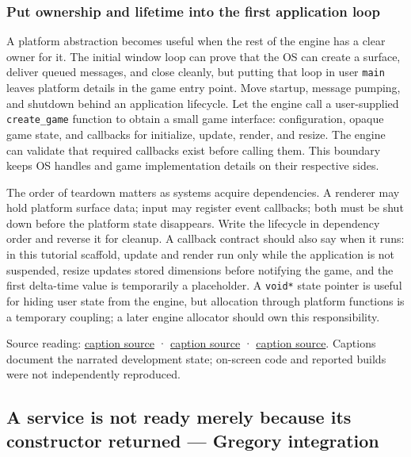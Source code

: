 \subsubsection{Put ownership and lifetime into the first application loop}\label{05-engine-i-ch013-put-ownership-and-lifetime-into-the-first-application-loop}

A platform abstraction becomes useful when the rest of the engine has a clear owner for it. The initial window loop can prove that the OS can create a surface, deliver queued messages, and close cleanly, but putting that loop in user \texttt{main} leaves platform details in the game entry point. Move startup, message pumping, and shutdown behind an application lifecycle. Let the engine call a user-supplied \texttt{create\_game} function to obtain a small game interface: configuration, opaque game state, and callbacks for initialize, update, render, and resize. The engine can validate that required callbacks exist before calling them. This boundary keeps OS handles and game implementation details on their respective sides.

The order of teardown matters as systems acquire dependencies. A renderer may hold platform surface data; input may register event callbacks; both must be shut down before the platform state disappears. Write the lifecycle in dependency order and reverse it for cleanup. A callback contract should also say when it runs: in this tutorial scaffold, update and render run only while the application is not suspended, resize updates stored dimensions before notifying the game, and the first delta-time value is temporarily a placeholder. A \texttt{void*} state pointer is useful for hiding user state from the engine, but allocation through platform functions is a temporary coupling; a later engine allocator should own this responsibility.

Source reading: \href{https://www.youtube.com/watch?v=jEbqCf-MsZs}{caption source} · \href{https://www.youtube.com/watch?v=ojEPsZFPj2Q}{caption source} · \href{https://www.youtube.com/watch?v=nGgvWzoCsyk}{caption source}. Captions document the narrated development state; on-screen code and reported builds were not independently reproduced.

\subsection{A service is not ready merely because its constructor returned --- Gregory integration}\label{05-engine-i-ch013-a-service-is-not-ready-merely-because-its-constructor-returned-gregory-integration}

